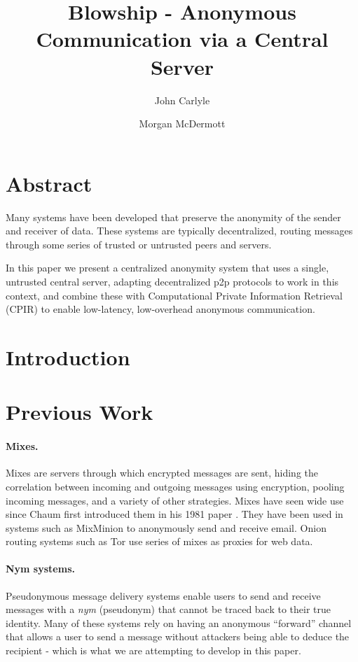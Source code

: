 \documentclass{paper}
\title{Blowship - Anonymous Communication via a Central Server}
\author[*]{John Carlyle}
\author[**]{Morgan McDermott}
\affil[*]{University of fighitng bears}
\affil[**]{University of sillypants}
\begin{document}
\maketitle
\twocolumn

\section*{Abstract} 
  Many systems have been developed that preserve the anonymity of the sender and receiver of data. These systems are typically decentralized, routing messages through some series of trusted or untrusted peers and servers. 

In this paper we present a centralized anonymity system that uses a single, untrusted central server, adapting decentralized p2p protocols to work in this context, and combine these with Computational Private Information Retrieval (CPIR) to enable low-latency, low-overhead anonymous communication.
\section{Introduction}
 
\section{Previous Work}
\paragraph{Mixes.} Mixes are servers through which encrypted messages are sent, hiding the correlation between incoming and outgoing messages using encryption, pooling incoming messages, and a variety of other strategies. Mixes have seen wide use since Chaum first introduced them in his 1981 paper \cite{chaum-mix}. They have been used in systems such as MixMinion\cite{minion-design} to anonymously send and receive email. Onion routing systems such as Tor \cite{tor-design} use series of mixes as proxies for web data. 

\paragraph{Nym systems.} Pseudonymous message delivery systems enable users to send and receive messages with a \textit{nym} (pseudonym) that cannot be traced back to their true identity. Many of these systems rely on having an anonymous ``forward'' channel that allows a user to send a message without attackers being able to deduce the recipient - which is what we are attempting to develop in this paper. 
\end{document}
